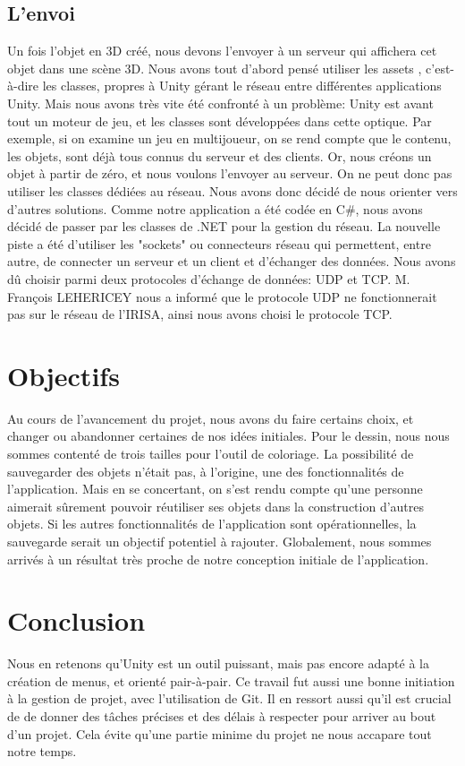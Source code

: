 \documentclass[a4paper,11pt]{article}
\begin{document}
		\subsection{L'envoi}
			Un fois l'objet en 3D créé, nous devons l'envoyer à un serveur qui affichera cet objet dans une scène 3D.
			Nous avons tout d'abord pensé utiliser les assets , c'est-à-dire les classes, propres à Unity gérant le réseau entre différentes applications Unity. Mais nous avons très vite été confronté à un problème: Unity est avant tout un moteur de jeu, et les classes sont développées dans cette optique.
			Par exemple, si on examine un jeu en multijoueur, on se rend compte que le contenu, les objets, sont déjà tous connus du serveur et des clients. Or, nous créons un objet à partir de zéro, et nous voulons l'envoyer au serveur. On ne peut donc pas utiliser les classes dédiées au réseau. Nous avons donc décidé de nous orienter vers d'autres solutions.
			Comme notre application a été codée en C\#, nous avons décidé de passer par les classes de .NET pour la gestion du réseau.
			La nouvelle piste a été d'utiliser les "sockets" ou connecteurs réseau qui permettent, entre autre, de connecter un serveur et un client et d'échanger des données. Nous avons dû choisir parmi deux protocoles d'échange de données: UDP et TCP.
			M. François LEHERICEY nous a informé que le protocole UDP ne fonctionnerait pas sur le réseau de l'IRISA, ainsi nous avons choisi le protocole TCP.
	\section{Objectifs}
		Au cours de l'avancement du projet, nous avons du faire certains choix, et changer ou abandonner certaines de nos idées initiales.
		Pour le dessin, nous nous sommes contenté de trois tailles pour l'outil de coloriage.
		La possibilité de sauvegarder des objets n'était pas, à l'origine, une des fonctionnalités de l'application. Mais en se concertant, on s'est rendu compte qu'une personne aimerait sûrement pouvoir réutiliser ses objets dans la construction d'autres objets. Si les autres fonctionnalités de l'application sont opérationnelles, la sauvegarde serait un objectif potentiel à rajouter.
		Globalement, nous sommes arrivés à un résultat très proche de notre conception initiale de l'application.
	\section{Conclusion}
			Nous en retenons qu'Unity est un outil puissant, mais pas encore adapté à la création de menus, et orienté pair-à-pair. Ce travail fut aussi une bonne initiation à la gestion de projet, avec l'utilisation de Git. Il en ressort aussi qu'il est crucial de de donner des tâches précises et des délais à respecter pour arriver au bout d'un projet. Cela évite qu'une partie minime du projet ne nous accapare tout notre temps.
			
\end{document}
